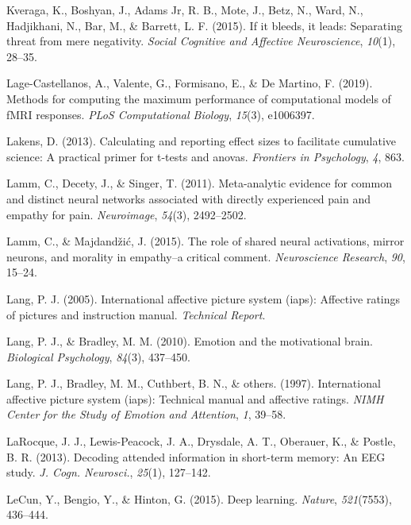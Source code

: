 \documentclass[11pt,american,a4paper,oneside,]{memoir} %
\begin{document}
\leavevmode\hypertarget{ref-kveraga2015if}{}%
Kveraga, K., Boshyan, J., Adams Jr, R. B., Mote, J., Betz, N., Ward, N., Hadjikhani, N., Bar, M., \& Barrett, L. F. (2015). If it bleeds, it leads: Separating threat from mere negativity. \emph{Social Cognitive and Affective Neuroscience}, \emph{10}(1), 28--35.

\leavevmode\hypertarget{ref-lage2019methods}{}%
Lage-Castellanos, A., Valente, G., Formisano, E., \& De Martino, F. (2019). Methods for computing the maximum performance of computational models of fMRI responses. \emph{PLoS Computational Biology}, \emph{15}(3), e1006397.

\leavevmode\hypertarget{ref-lakens2013calculating}{}%
Lakens, D. (2013). Calculating and reporting effect sizes to facilitate cumulative science: A practical primer for t-tests and anovas. \emph{Frontiers in Psychology}, \emph{4}, 863.

\leavevmode\hypertarget{ref-lamm2011meta}{}%
Lamm, C., Decety, J., \& Singer, T. (2011). Meta-analytic evidence for common and distinct neural networks associated with directly experienced pain and empathy for pain. \emph{Neuroimage}, \emph{54}(3), 2492--2502.

\leavevmode\hypertarget{ref-lamm2015role}{}%
Lamm, C., \& Majdandžić, J. (2015). The role of shared neural activations, mirror neurons, and morality in empathy--a critical comment. \emph{Neuroscience Research}, \emph{90}, 15--24.

\leavevmode\hypertarget{ref-lang2005international}{}%
Lang, P. J. (2005). International affective picture system (iaps): Affective ratings of pictures and instruction manual. \emph{Technical Report}.

\leavevmode\hypertarget{ref-lang2010emotion}{}%
Lang, P. J., \& Bradley, M. M. (2010). Emotion and the motivational brain. \emph{Biological Psychology}, \emph{84}(3), 437--450.

\leavevmode\hypertarget{ref-lang1997international}{}%
Lang, P. J., Bradley, M. M., Cuthbert, B. N., \& others. (1997). International affective picture system (iaps): Technical manual and affective ratings. \emph{NIMH Center for the Study of Emotion and Attention}, \emph{1}, 39--58.

\leavevmode\hypertarget{ref-LaRocque2013-sh}{}%
LaRocque, J. J., Lewis-Peacock, J. A., Drysdale, A. T., Oberauer, K., \& Postle, B. R. (2013). Decoding attended information in short-term memory: An EEG study. \emph{J. Cogn. Neurosci.}, \emph{25}(1), 127--142.

\leavevmode\hypertarget{ref-LeCun2015-xa}{}%
LeCun, Y., Bengio, Y., \& Hinton, G. (2015). Deep learning. \emph{Nature}, \emph{521}(7553), 436--444.
\end{document}
